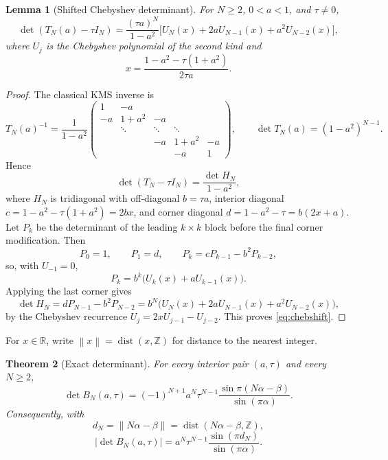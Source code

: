 \documentclass[11pt,reqno]{amsart}
\theoremstyle{plain}
\newtheorem{theorem}{Theorem}
\newtheorem{lemma}[theorem]{Lemma}
\theoremstyle{definition}
\newcommand{\BN}{B_N}
\newcommand{\TN}{T_N}
\newcommand{\Z}{\mathbb{Z}}
\DeclareMathOperator{\dist}{dist}
\newcommand{\norm}[1]{\left\lVert #1\right\rVert}
\begin{document}
\begin{lemma}[Shifted Chebyshev determinant]\label{lem:chebshift}
For $N\ge2$, $0<a<1$, and $\tau\ne0$,
\begin{equation}\label{eq:chebshift}
\det(\TN(a)-\tau I_N)
=\frac{(\tau a)^N}{1-a^2}
\bigl[U_N(x)+2aU_{N-1}(x)+a^2U_{N-2}(x)\bigr],
\end{equation}
where $U_j$ is the Chebyshev polynomial of the second kind and
\begin{equation}\label{eq:xdef}
x=\frac{1-a^2-\tau(1+a^2)}{2\tau a}.
\end{equation}
\end{lemma}

\begin{proof}
The classical KMS inverse is
\[
\TN(a)^{-1}=\frac1{1-a^2}
\begin{pmatrix}
1&-a&&&\\
-a&1+a^2&-a&&\\
&\ddots&\ddots&\ddots&\\
&&-a&1+a^2&-a\\
&&&-a&1
\end{pmatrix},
\qquad
\det\TN(a)=(1-a^2)^{N-1}.
\]
Hence
\[
\det(\TN-\tau I_N)=\frac{\det H_N}{1-a^2},
\]
where $H_N$ is tridiagonal with off-diagonal $b=\tau a$, interior diagonal
$c=1-a^2-\tau(1+a^2)=2bx$, and corner diagonal
$d=1-a^2-\tau=b(2x+a)$.
Let $P_k$ be the determinant of the leading $k\times k$ block before the final
corner modification.  Then
\[
P_0=1,\qquad P_1=d,\qquad P_k=cP_{k-1}-b^2P_{k-2},
\]
so, with $U_{-1}=0$,
\[
P_k=b^k\bigl(U_k(x)+aU_{k-1}(x)\bigr).
\]
Applying the last corner gives
\[
\det H_N=dP_{N-1}-b^2P_{N-2}
=b^N\bigl(U_N(x)+2aU_{N-1}(x)+a^2U_{N-2}(x)\bigr),
\]
by the Chebyshev recurrence $U_j=2xU_{j-1}-U_{j-2}$.  This proves
\eqref{eq:chebshift}.
\end{proof}

For $x\in\mathbb R$, write $\norm{x}=\dist(x,\mathbb Z)$ for distance to the
nearest integer.

\begin{theorem}[Exact determinant]\label{thm:det}
For every interior pair $(a,\tau)$ and every $N\ge2$,
\begin{equation}\label{eq:det}
\boxed{
\det\BN(a,\tau)
=(-1)^{N+1}a^N\tau^{N-1}
\frac{\sin\pi(N\alpha-\beta)}{\sin(\pi\alpha)}.}
\end{equation}
Consequently, with
\begin{equation}\label{eq:dN}
d_N=\norm{N\alpha-\beta}=\dist(N\alpha-\beta,\Z),
\end{equation}
\begin{equation}\label{eq:detdepth}
|\det\BN(a,\tau)|
=a^N\tau^{N-1}
\frac{\sin(\pi d_N)}{\sin(\pi\alpha)}.
\end{equation}
\end{theorem}
\end{document}
